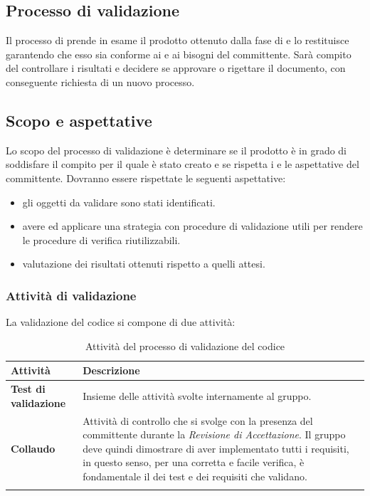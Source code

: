 {{\subsection{Processo di validazione}
Il processo di  prende in esame il prodotto ottenuto dalla fase di  e lo restituisce garantendo che esso sia conforme ai  e ai bisogni del committente. Sarà compito del \RdP{} controllare i risultati e decidere se approvare o rigettare il documento, con conseguente richiesta di un nuovo processo. 

\subsection{Scopo e aspettative}
Lo scopo del processo di validazione è determinare se il prodotto è in grado di soddisfare il compito per il quale è stato creato e se rispetta i  e le aspettative del committente. Dovranno essere rispettate le seguenti aspettative:

\begin{itemize}
	\item gli oggetti da validare sono stati identificati.
	\item avere ed applicare una strategia con procedure di validazione utili per rendere le procedure di verifica riutilizzabili.
	\item valutazione dei risultati ottenuti rispetto a quelli attesi. 
\end{itemize}


\subsubsection{Attività di validazione}
La validazione del codice si compone di due attività:
\setlength{\freewidth}{\dimexpr\textwidth-0\tabcolsep}
	\renewcommand{\arraystretch}{1.5}
	\setlength{\aboverulesep}{0pt}
	\setlength{\belowrulesep}{0pt}
	\begin{longtable}{L{.20\freewidth} L{.70\freewidth}}
		\textbf{Attività} & \textbf{Descrizione} \\
		\toprule
		\endhead
		\textbf{Test di validazione} & Insieme delle attività svolte internamente al gruppo.\\
		\textbf{Collaudo} & Attività di controllo che si svolge con la presenza del committente durante la \emph{Revisione di Accettazione}. Il gruppo deve quindi dimostrare di aver implementato tutti i requisiti, in questo senso, per una corretta e facile verifica, è fondamentale il  dei test e dei requisiti che validano.\\
		\bottomrule
		\hiderowcolors
		\caption{Attività del processo di validazione del codice}
	\end{longtable}

}}

